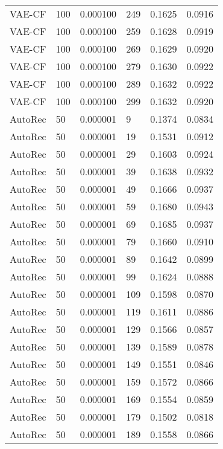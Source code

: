 \begin{tabular}{llrlrr}
  VAE-CF &  100 &  0.000100 &   249 &  0.1625 &       0.0916 \\
  VAE-CF &  100 &  0.000100 &   259 &  0.1628 &       0.0919 \\
  VAE-CF &  100 &  0.000100 &   269 &  0.1629 &       0.0920 \\
  VAE-CF &  100 &  0.000100 &   279 &  0.1630 &       0.0922 \\
  VAE-CF &  100 &  0.000100 &   289 &  0.1632 &       0.0922 \\
  VAE-CF &  100 &  0.000100 &   299 &  0.1632 &       0.0920 \\
 AutoRec &   50 &  0.000001 &     9 &  0.1374 &       0.0834 \\
 AutoRec &   50 &  0.000001 &    19 &  0.1531 &       0.0912 \\
 AutoRec &   50 &  0.000001 &    29 &  0.1603 &       0.0924 \\
 AutoRec &   50 &  0.000001 &    39 &  0.1638 &       0.0932 \\
 AutoRec &   50 &  0.000001 &    49 &  0.1666 &       0.0937 \\
 AutoRec &   50 &  0.000001 &    59 &  0.1680 &       0.0943 \\
 AutoRec &   50 &  0.000001 &    69 &  0.1685 &       0.0937 \\
 AutoRec &   50 &  0.000001 &    79 &  0.1660 &       0.0910 \\
 AutoRec &   50 &  0.000001 &    89 &  0.1642 &       0.0899 \\
 AutoRec &   50 &  0.000001 &    99 &  0.1624 &       0.0888 \\
 AutoRec &   50 &  0.000001 &   109 &  0.1598 &       0.0870 \\
 AutoRec &   50 &  0.000001 &   119 &  0.1611 &       0.0886 \\
 AutoRec &   50 &  0.000001 &   129 &  0.1566 &       0.0857 \\
 AutoRec &   50 &  0.000001 &   139 &  0.1589 &       0.0878 \\
 AutoRec &   50 &  0.000001 &   149 &  0.1551 &       0.0846 \\
 AutoRec &   50 &  0.000001 &   159 &  0.1572 &       0.0866 \\
 AutoRec &   50 &  0.000001 &   169 &  0.1554 &       0.0859 \\
 AutoRec &   50 &  0.000001 &   179 &  0.1502 &       0.0818 \\
 AutoRec &   50 &  0.000001 &   189 &  0.1558 &       0.0866 \\

\end{tabular}
